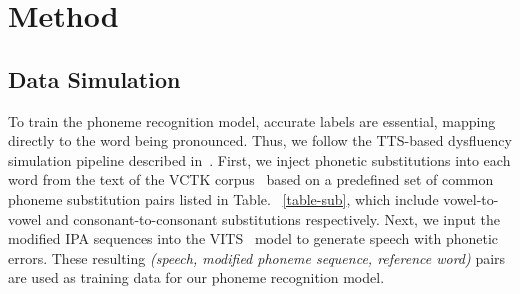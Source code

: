 \section{Method}

\subsection{Data Simulation}
\label{sec:data-simulation}
To train the phoneme recognition model, accurate labels are essential, mapping directly to the word being pronounced. Thus, we follow the TTS-based dysfluency simulation pipeline described in~\cite{zhou24eyolostutter}. First, we inject phonetic substitutions into each word from the text of the VCTK corpus~\cite{yamagishi2019cstr-vctk} based on a predefined set of common phoneme substitution pairs listed in Table. ~\ref{table-sub}, which include vowel-to-vowel and consonant-to-consonant substitutions respectively. Next, we input the modified IPA sequences into the VITS~\cite{kim2021conditional-vits} model to generate speech with phonetic errors. These resulting \textit{(speech, modified phoneme sequence, reference word)} pairs are used as training data for our phoneme recognition model.

\vspace{-5pt}
\begin{table}[h]
    \caption{Common CMU phoneme substitution pairs}
    \label{table-sub}
    \centering
    \setlength{\tabcolsep}{6pt} 
    \renewcommand{\arraystretch}{1.2} 
\end{table}



